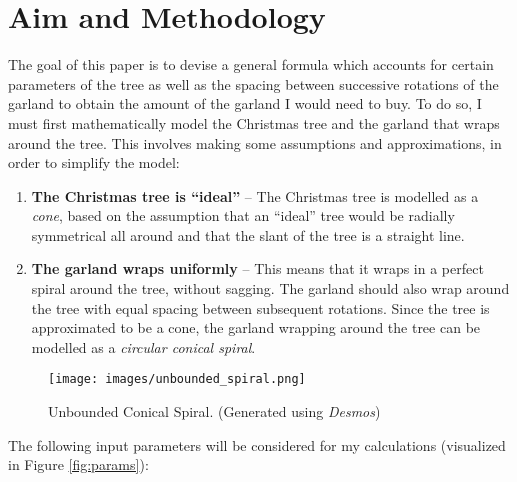 \section{Aim and Methodology}
The goal of this paper is to devise a general formula which accounts for certain parameters of the tree as well as the spacing between successive rotations of the garland to obtain the amount of the garland I would need to buy. To do so, I must first mathematically model the Christmas tree and the garland that wraps around the tree. This involves making some assumptions and approximations, in order to simplify the model:

\begin{enumerate}[leftmargin=!, itemindent=-5ex]
    \item \textbf{The Christmas tree is “ideal”} -- The Christmas tree is modelled as a \emph{cone}, based on the assumption that an “ideal” tree would be radially symmetrical all around and that the slant of the tree is a straight line.
    \item \textbf{The garland wraps uniformly} -- This means that it wraps in a perfect spiral around the tree, without sagging. The garland should also wrap around the tree with equal spacing between subsequent rotations. Since the tree is approximated to be a cone, the garland wrapping around the tree can be modelled as a \emph{circular conical spiral}.
\end{enumerate}

\begin{figure}[H]
    \centering
    \texttt{[image: images/unbounded\_spiral.png]}
    \caption{Unbounded Conical Spiral. (Generated using \emph{Desmos})}
    \vspace*{-20pt}
\end{figure}

\noindent
The following input parameters will be considered for my calculations (visualized in Figure \ref{fig:params}):

